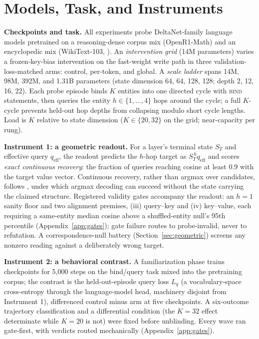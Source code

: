 \section{Models, Task, and Instruments}
\label{sec:setting}

\textbf{Checkpoints and task.} All experiments probe DeltaNet-family
language models \citep{yang2024parallelizing} pretrained on a
reasoning-dense corpus mix (OpenR1-Math) and an encyclopedic mix
(WikiText-103, \citealp{merity2017pointer}). An \emph{intervention grid}
(14M parameters) varies a frozen-key-bias intervention on the fast-weight
write path in three validation-loss-matched arms: control, per-token, and
global. A \emph{scale ladder} spans 14M, 98M, 392M, and 1.31B parameters
(state dimension 64, 64, 128, 128; depth 2, 12, 16, 22).
Each probe episode binds $K$ entities into one directed cycle with
\textsc{bind} statements, then queries the entity $h \in \{1,\dots,4\}$
hops around the cycle; a full $K$-cycle prevents held-out hop depths from
collapsing modulo short cycle lengths. Load is $K$ relative to state
dimension ($K \in \{20, 32\}$ on the grid; near-capacity per rung).

\textbf{Instrument 1: a geometric readout.} For a layer's terminal state
$S_T$ and effective query $q_{\mathrm{eff}}$, the readout predicts the
$h$-hop target as $S_T^{\,h} q_{\mathrm{eff}}$ and scores \emph{exact
continuous recovery}: the fraction of queries reaching cosine at least 0.9
with the target value vector. Continuous recovery, rather than argmax over
candidates, follows \citet{nichani2024understanding}, under which argmax
decoding can succeed without the state carrying the claimed structure.
Registered validity gates accompany the readout: an $h{=}1$ sanity floor
and two alignment premises, (iii) query--key and (iv) key--value, each
requiring a same-entity median cosine above a shuffled-entity null's 95th
percentile (Appendix~\ref{app:gates}); gate failure routes to
probe-invalid, never to refutation. A correspondence-null battery
(Section~\ref{sec:geometric}) screens any nonzero reading against a
deliberately wrong target.

\textbf{Instrument 2: a behavioral contrast.} A familiarization phase
trains checkpoints for 5{,}000 steps on the bind/query task mixed into the
pretraining corpus; the contrast is the held-out-episode query loss $L_q$
(a vocabulary-space cross-entropy through the language-model head,
machinery disjoint from Instrument 1), differenced control minus arm at
five checkpoints. A six-outcome trajectory classification and a
differential condition (the $K{=}32$ effect determinate while $K{=}20$ is
not) were fixed before unblinding. Every wave ran gate-first, with
verdicts routed mechanically (Appendix~\ref{app:gates}).
